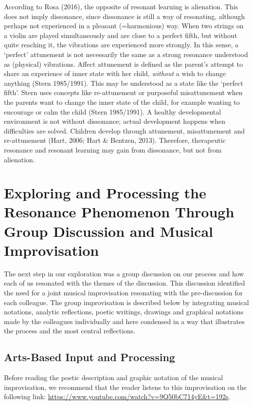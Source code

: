 \begin{adjmulticols}{2}{0mm}{0mm}
According to Rosa (2016), the opposite of resonant learning is alienation. This does not imply dissonance, since dissonance is still a way of resonating, although perhaps not experienced in a pleasant (=harmonious) way. When two strings on a violin are played simultaneously and are close to a perfect fifth, but without quite reaching it, the vibrations are experienced more strongly. In this sense, a ‘perfect’ attunement is not necessarily the same as a strong resonance understood as (physical) vibrations. Affect attunement is defined as the parent’s attempt to share an experience of inner state with her child, \textit{without} a wish to change anything (Stern 1985/1991). This may be understood as a state like the ‘perfect fifth’. Stern uses concepts like re-attunement or purposeful misattunement when the parents want to change the inner state of the child, for example wanting to encourage or calm the child (Stern 1985/1991). A healthy developmental environment is not without dissonance; actual development happens when difficulties are solved. Children develop through attunement, misattunement and re-attunement (Hart, 2006; Hart \& Bentzen, 2013). Therefore, therapeutic resonance and resonant learning may gain from dissonance, but not from alienation.  

\chapter{Exploring and Processing the Resonance Phenomenon Through Group Discussion and Musical Improvisation}
The next step in our exploration was a group discussion on our process and how each of us resonated with the themes of the discussion. This discussion identified the need for a joint musical improvisation resonating with the pre-discussion for each colleague. The group improvisation is described below by integrating musical notations, analytic reflections, poetic writings, drawings and graphical notations made by the colleagues individually and here condensed in a way that illustrates the process and the most central reflections.  

\section{Arts-Based Input and Processing}
Before reading the poetic description and graphic notation of the musical improvisation, we recommend that the reader listens to this improvisation on the following link: \url{https://www.youtube.com/watch?v=9Q50bC714yE&t=192s}. 


\end{adjmulticols}
